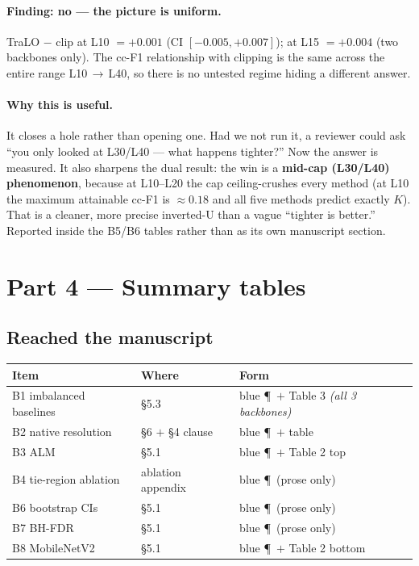 \documentclass[11pt,a4paper]{article}
\begin{document}
\paragraph{Finding: no --- the picture is uniform.} TraLO $-$ clip at L10 $= +0.001$
(CI $[-0.005, +0.007]$); at L15 $= +0.004$ (two backbones only). The cc-F1 relationship with
clipping is the same across the entire range L10\,$\rightarrow$\,L40, so there is no untested
regime hiding a different answer.

\paragraph{Why this is useful.} It closes a hole rather than opening one. Had we not run it, a
reviewer could ask ``you only looked at L30/L40 --- what happens tighter?'' Now the answer is
measured. It also sharpens the dual result: the win is a \textbf{mid-cap (L30/L40) phenomenon},
because at L10--L20 the cap ceiling-crushes every method (at L10 the maximum attainable cc-F1 is
$\approx 0.18$ and all five methods predict exactly $K$). That is a cleaner, more precise
inverted-U than a vague ``tighter is better.'' Reported inside the B5/B6 tables rather than as its
own manuscript section.

\newpage
\section*{Part 4 --- Summary tables}

\subsection*{Reached the manuscript}

\begin{center}
\begin{tabular}{@{}l l l@{}}
\toprule
\textbf{Item} & \textbf{Where} & \textbf{Form} \\
\midrule
B1 imbalanced baselines & \S5.3 & blue \P\ $+$ Table 3
  \textcolor{okgreen}{\emph{(all 3 backbones)}} \\
B2 native resolution    & \S6 $+$ \S4 clause & blue \P\ $+$ table \\
B3 ALM                  & \S5.1 & blue \P\ $+$ Table 2 top \\
B4 tie-region ablation  & ablation appendix & blue \P\ (prose only) \\
B6 bootstrap CIs        & \S5.1 & blue \P\ (prose only) \\
B7 BH-FDR               & \S5.1 & blue \P\ (prose only) \\
B8 MobileNetV2          & \S5.1 & blue \P\ $+$ Table 2 bottom \\
\bottomrule
\end{tabular}
\end{center}
\end{document}
